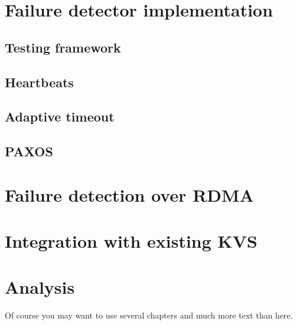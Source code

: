 \documentclass[bsc,frontabs,twoside,singlespacing,parskip,deptreport,hidel]{infthesis}     %
\begin{document}
\chapter{Failure detector implementation}
\section{Testing framework}
\section{Heartbeats}
\section{Adaptive timeout}
\section{PAXOS}

\chapter{Failure detection over RDMA}

\chapter{Integration with existing KVS}
\chapter{Analysis}

Of course
you may want to use several chapters and much more text than here.



\end{document}
